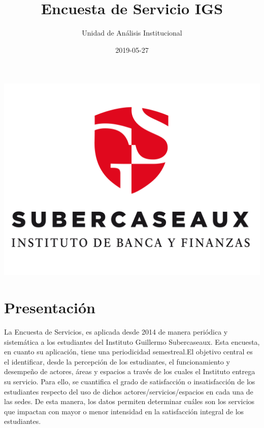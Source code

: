\documentclass[]{book}
\title{Encuesta de Servicio IGS}
\author{Unidad de Análisis Institucional}
\date{2019-05-27}
\begin{document}
\maketitle

{
\setcounter{tocdepth}{1}
\tableofcontents
}
\chapter*{}\label{section}

\begin{center}\includegraphics{images/logoieb} \end{center}

\chapter*{Presentación}\label{presentacion}

La Encuesta de Servicios, es aplicada desde 2014 de manera periódica y
sistemática a los estudiantes del Instituto Guillermo Subercaseaux. Esta
encuesta, en cuanto su aplicación, tiene una periodicidad semestreal.El
objetivo central es el identificar, desde la percepción de los
estudiantes, el funcionamiento y desempeño de actores, áreas y espacios
a través de los cuales el Instituto entrega su servicio. Para ello, se
cuantifica el grado de satisfacción o insatisfacción de los estudiantes
respecto del uso de dichos actores/servicios/espacios en cada una de las
sedes. De esta manera, los datos permiten determinar cuáles son los
servicios que impactan con mayor o menor intensidad en la satisfacción
integral de los estudiantes.
\end{document}
